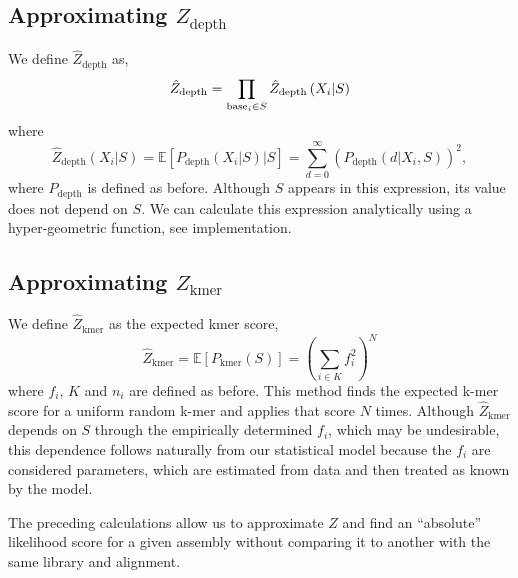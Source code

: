 \documentclass[phd,tocprelim]{cornell}
\begin{document}

\subsection{Approximating $Z_{\text{depth}}$} %
\label{sub:Aprroximating Z_depth}

We define $\hat{Z}_{\text{depth}}$ as,
\begin{equation}
    \hat{Z}_{\text{depth}} = \prod_{{\rm base}_{i} \in S} \hat{Z}_{\text{depth}} \left(X_{i}|S\right)
\end{equation}
where
\begin{equation}
    \hat{Z}_{\text{depth}} \left(X_{i}|S\right) = \mathbb{E}\left[P_{\text{depth}} \left(X_{i}|S\right)|S\right] = \sum_{d=0}^{\infty} \left(P_{\text{depth}}\left(d | X_{i}, S\right)\right)^{2},
\end{equation}
where $P_{\text{depth}}$ is defined as before. Although $S$ appears in this expression, its value does not depend on $S$. We can calculate this expression analytically using a hyper-geometric function, see implementation.


\subsection{Approximating $Z_{\text{kmer}}$} %
\label{sub:Aprroximating Z_kmer}

We define $\hat{Z}_{\text{kmer}}$ as the expected kmer score,
\begin{equation}
    \hat{Z}_{\text{kmer}} = \mathbb{E}\left[P_{\text{kmer}}(S)\right] = \left(\sum_{i\in K} f_{i}^{2}\right)^{N}
\end{equation}
where $f_{i}$, $K$ and $n_{i}$ are defined as before. This method finds the expected k-mer score for a uniform random k-mer and applies that score $N$ times. Although $\hat{Z}_{\text{kmer}}$ depends on $S$ through the empirically determined $f_{i}$, which may be undesirable, this dependence follows naturally from our statistical model because the $f_{i}$ are considered parameters, which are estimated from data and then treated as known by the model. 


The preceding calculations allow us to approximate $Z$ and find an “absolute” likelihood score for a given assembly without comparing it to another with the same library and alignment.
\end{document}
